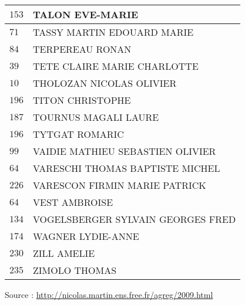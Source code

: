\begin{xltabular}{\linewidth}{|l|X|}
    \hline
    $153$ & TALON EVE-MARIE \\
    \hline
    $71$ & TASSY MARTIN EDOUARD MARIE \\
    \hline
    $84$ & TERPEREAU RONAN \\
    \hline
    $39$ & TETE CLAIRE MARIE CHARLOTTE \\
    \hline
    $10$ & THOLOZAN NICOLAS OLIVIER \\
    \hline
    $196$ & TITON CHRISTOPHE \\
    \hline
    $187$ & TOURNUS MAGALI LAURE \\
    \hline
    $196$ & TYTGAT ROMARIC \\
    \hline
    $99$ & VAIDIE MATHIEU SEBASTIEN OLIVIER \\
    \hline
    $64$ & VARESCHI THOMAS BAPTISTE MICHEL \\
    \hline
    $226$ & VARESCON FIRMIN MARIE PATRICK \\
    \hline
    $64$ & VEST AMBROISE \\
    \hline
    $134$ & VOGELSBERGER SYLVAIN GEORGES FRED \\
    \hline
    $174$ & WAGNER LYDIE-ANNE \\
    \hline
    $230$ & ZILL AMELIE \\
    \hline
    $235$ & ZIMOLO THOMAS \\
    \hline
  \end{xltabular}

  \begin{flushright}
    {\tiny Source : \url{http://nicolas.martin.ens.free.fr/agreg/2009.html}}
  \end{flushright}

